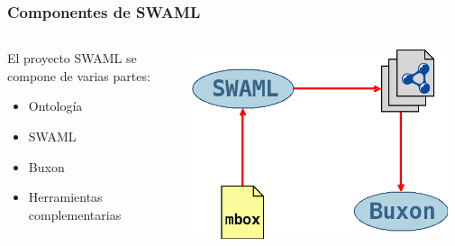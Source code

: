 \documentclass[spanish,notes=hide]{beamer}
\begin{document}
%
%

\frame
{
  \frametitle{Componentes de SWAML}

  \begin{columns}
   \begin{column}{0.35\textwidth}
	El proyecto SWAML se compone de varias partes:
	\begin{itemize}
	 \item \begin{Large}Ontología\end{Large}
	 \item \begin{Large}SWAML\end{Large}
	 \item \begin{Large}Buxon\end{Large}
	 \item \begin{Large}Herramientas complementarias\end{Large}
	\end{itemize}
   \end{column}
   \begin{column}{0.65\textwidth}
	\includegraphics[width=0.95\textwidth]{images/componentes.png}
   \end{column}
  \end{columns}
}
\end{document}
